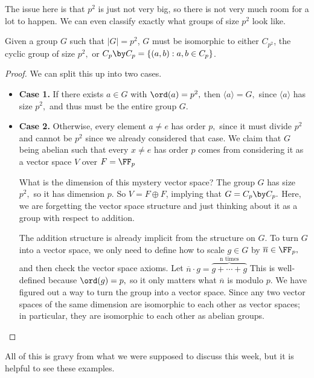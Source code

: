The issue here is that $p^2$ is just not very big, so there is not very much room for a lot to happen.
We can even classify exactly what groups of size $p^2$ look like.
\begin{corollary}
Given a group $G$ such that $|G| = p^2$, $G$ must be isomorphic to either $C_{p^2}$, the cyclic group of size $p^2,$ or $C_p \by C_p = \{(a, b): a, b \in C_p\}$. 
\end{corollary}


\begin{proof}

We can split this up into two cases.
\begin{itemize}
    \item \textbf{Case 1.} If there exists $a \in G$ with $\ord(a) = p^2,$ then $\langle a \rangle = G,$ since $\langle a \rangle$ has size $p^2,$ and thus must be the entire group $G.$ 
    
    \item \textbf{Case 2.} Otherwise, every element $a \neq e$ has order $p,$ since it must divide $p^2$ and cannot be $p^2$ since we already considered that case. We claim that $G$ being abelian such that every $x \neq e$ has order $p$ comes from considering it as a vector space $V$ over $F = \FF_p$ %
    
    What is the dimension of this mystery vector space? The group $G$ has size $p^2,$ so it has dimension $p.$ So $V = F \oplus F$, implying that $G = C_p \by C_p.$ Here, we are forgetting the vector space structure and just thinking about it as a group with respect to addition.
    
    The addition structure is already implicit from the structure on $G.$ To turn $G$ into a vector space, we only need to define how to scale $g \in G$ by $\overline{n} \in \FF_p,$ and then check the vector space axioms. Let $\overline{n} \cdot g = \overbrace{g + \cdots + g}^{\text{n times}}$ This is well-defined because $\ord(g) = p,$ so it only matters what $\overline{n}$ is modulo $p.$
    We have figured out a way to turn the group into a vector space. Since any two vector spaces of the same dimension are isomorphic to each other as vector spaces; in particular, they are isomorphic to each other as abelian groups.

\end{itemize}

\end{proof}


All of this is gravy from what we were supposed to discuss this week, but it is helpful to see these examples.

